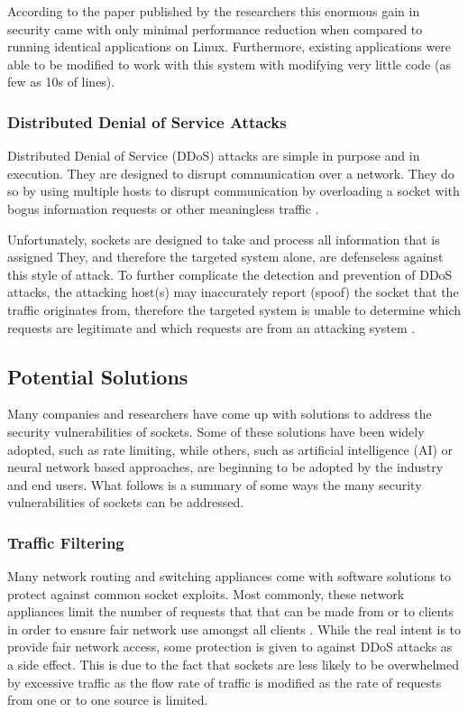 \documentclass[conference, 12pt]{IEEEtran}
\begin{document}
According to the paper published by the researchers this enormous gain in security came with only minimal performance reduction when compared to running identical applications on Linux. Furthermore, existing applications were able to be modified to work with this system with modifying very little code (as few as 10s of lines).

\subsubsection{Distributed Denial of Service Attacks}
Distributed Denial of Service (DDoS) attacks are simple in purpose and in execution. They are designed to disrupt communication over a network. They do so by using multiple hosts to disrupt communication by overloading a socket with bogus information requests or other meaningless traffic \cite{herbert2015ddos}.

Unfortunately, sockets are designed to take and process all information that is assigned They, and therefore the targeted system alone, are defenseless against this style of attack. To further complicate the detection and prevention of DDoS attacks, the attacking host(s) may inaccurately report (spoof) the socket that the traffic originates from, therefore the targeted system is unable to determine which requests are legitimate and which requests are from an attacking system \cite{herbert2015ddos}.

\subsection{Potential Solutions}
Many companies and researchers have come up with solutions to address the security vulnerabilities of sockets. Some of these solutions have been widely adopted, such as rate limiting, while others, such as artificial intelligence (AI) or neural network based approaches, are beginning to be adopted by the industry and end users. What follows is a summary of some ways the many security vulnerabilities of sockets can be addressed.

\subsubsection{Traffic Filtering}
Many network routing and switching appliances come with software solutions to protect against common socket exploits. Most commonly, these network appliances limit the number of requests that that can be made from or to clients in order to ensure fair network use amongst all clients \cite{herbert2015ddos}. While the real intent is to provide fair network access, some protection is given to against DDoS attacks as a side effect. This is due to the fact that sockets are less likely to be overwhelmed by excessive traffic as the flow rate of traffic is modified as the rate of requests from one or to one source is limited.
\end{document}
